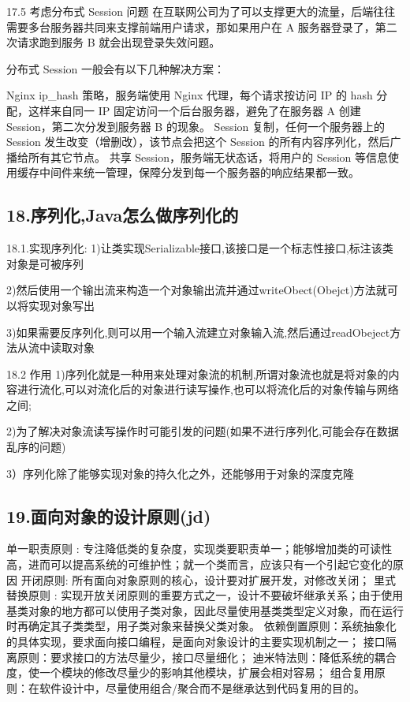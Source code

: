 \documentclass[UTF8]{ctexart}
\begin{document}
17.5 考虑分布式 Session 问题
在互联网公司为了可以支撑更大的流量，后端往往需要多台服务器共同来支撑前端用户请求，那如果用户在 A 服务器登录了，第二次请求跑到服务 B 就会出现登录失效问题。

分布式 Session 一般会有以下几种解决方案：

Nginx ip\_hash 策略，服务端使用 Nginx 代理，每个请求按访问 IP 的 hash 分配，这样来自同一 IP 固定访问一个后台服务器，避免了在服务器 A 创建 Session，第二次分发到服务器 B 的现象。
Session 复制，任何一个服务器上的 Session 发生改变（增删改），该节点会把这个 Session 的所有内容序列化，然后广播给所有其它节点。
共享 Session，服务端无状态话，将用户的 Session 等信息使用缓存中间件来统一管理，保障分发到每一个服务器的响应结果都一致。

\subsection{18.序列化,Java怎么做序列化的}

18.1.实现序列化:
1)让类实现Serializable接口,该接口是一个标志性接口,标注该类对象是可被序列

2)然后使用一个输出流来构造一个对象输出流并通过writeObect(Obejct)方法就可以将实现对象写出

3)如果需要反序列化,则可以用一个输入流建立对象输入流,然后通过readObeject方法从流中读取对象

18.2 作用
1)序列化就是一种用来处理对象流的机制,所谓对象流也就是将对象的内容进行流化,可以对流化后的对象进行读写操作,也可以将流化后的对象传输与网络之间;

2)为了解决对象流读写操作时可能引发的问题(如果不进行序列化,可能会存在数据乱序的问题)

3）序列化除了能够实现对象的持久化之外，还能够用于对象的深度克隆

\subsection{19.面向对象的设计原则(jd)}

单一职责原则 : 专注降低类的复杂度，实现类要职责单一；能够增加类的可读性高，进而可以提高系统的可维护性；就一个类而言，应该只有一个引起它变化的原因
开闭原则: 所有面向对象原则的核心，设计要对扩展开发，对修改关闭；
里式替换原则 : 实现开放关闭原则的重要方式之一，设计不要破坏继承关系；由于使用基类对象的地方都可以使用子类对象，因此尽量使用基类类型定义对象，而在运行时再确定其子类类型，用子类对象来替换父类对象。
依赖倒置原则：系统抽象化的具体实现，要求面向接口编程，是面向对象设计的主要实现机制之一；
接口隔离原则：要求接口的方法尽量少，接口尽量细化；
迪米特法则：降低系统的耦合度，使一个模块的修改尽量少的影响其他模块，扩展会相对容易；
组合复用原则：在软件设计中，尽量使用组合/聚合而不是继承达到代码复用的目的。
\end{document}
